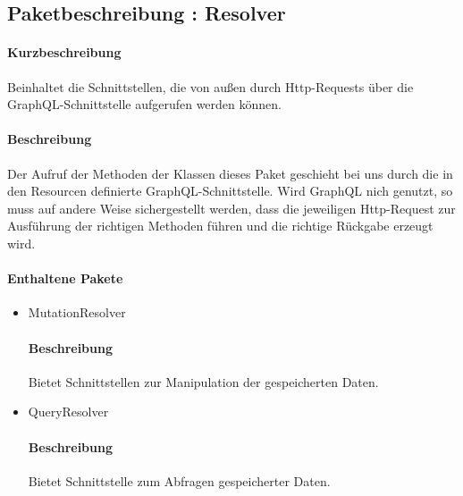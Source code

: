 \subsection{Paketbeschreibung : Resolver}%
\paragraph*{Kurzbeschreibung}
Beinhaltet die Schnittstellen, die von außen durch Http-Requests über die GraphQL-Schnittstelle aufgerufen werden können.
\paragraph*{Beschreibung}
Der Aufruf der Methoden der Klassen dieses Paket geschieht bei uns durch die in den Resourcen definierte GraphQL-Schnittstelle.
Wird GraphQL nich genutzt, so muss auf andere Weise sichergestellt werden, dass die jeweiligen Http-Request zur Ausführung der richtigen Methoden
führen und die richtige Rückgabe erzeugt wird.
\paragraph*{Enthaltene Pakete}
\begin{itemize}
    \item MutationResolver
    		\paragraph*{Beschreibung}
            Bietet Schnittstellen zur Manipulation der gespeicherten Daten.
    \item QueryResolver
    		\paragraph*{Beschreibung}
    		Bietet Schnittstelle zum Abfragen gespeicherter Daten.
\end{itemize}
